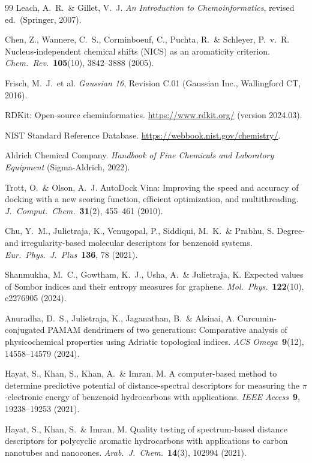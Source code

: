 \documentclass[12pt,a4paper]{article}
\begin{document}
\begin{thebibliography}{99}
Leach, A.~R.\ \& Gillet, V.~J.
\textit{An Introduction to Chemoinformatics}, revised ed.\ (Springer, 2007).

Chen, Z., Wannere, C.~S., Corminboeuf, C., Puchta, R.\ \& Schleyer, P.~v.~R.
Nucleus-independent chemical shifts (NICS) as an aromaticity criterion.
\textit{Chem.\ Rev.}\ \textbf{105}(10), 3842--3888 (2005).

Frisch, M.~J.\ et al.
\textit{Gaussian 16}, Revision C.01 (Gaussian Inc., Wallingford CT, 2016).

RDKit: Open-source cheminformatics. \url{https://www.rdkit.org/} (version 2024.03).

NIST Standard Reference Database.
\url{https://webbook.nist.gov/chemistry/}.

Aldrich Chemical Company.
\textit{Handbook of Fine Chemicals and Laboratory Equipment} (Sigma-Aldrich, 2022).

Trott, O.\ \& Olson, A.~J.
AutoDock Vina: Improving the speed and accuracy of docking with a new scoring function, efficient optimization, and multithreading.
\textit{J.\ Comput.\ Chem.}\ \textbf{31}(2), 455--461 (2010).

Chu, Y.~M., Julietraja, K., Venugopal, P., Siddiqui, M.~K.\ \& Prabhu, S.
Degree- and irregularity-based molecular descriptors for benzenoid systems.
\textit{Eur.\ Phys.\ J.\ Plus}\ \textbf{136}, 78 (2021).

Shanmukha, M.~C., Gowtham, K.~J., Usha, A.\ \& Julietraja, K.
Expected values of Sombor indices and their entropy measures for graphene.
\textit{Mol.\ Phys.}\ \textbf{122}(10), e2276905 (2024).

Anuradha, D.~S., Julietraja, K., Jaganathan, B.\ \& Alsinai, A.
Curcumin-conjugated PAMAM dendrimers of two generations: Comparative analysis of physicochemical properties using Adriatic topological indices.
\textit{ACS Omega}\ \textbf{9}(12), 14558--14579 (2024).

Hayat, S., Khan, S., Khan, A.\ \& Imran, M.
A computer-based method to determine predictive potential of distance-spectral descriptors for measuring the $\pi$-electronic energy of benzenoid hydrocarbons with applications.
\textit{IEEE Access}\ \textbf{9}, 19238--19253 (2021).

Hayat, S., Khan, S.\ \& Imran, M.
Quality testing of spectrum-based distance descriptors for polycyclic aromatic hydrocarbons with applications to carbon nanotubes and nanocones.
\textit{Arab.\ J.\ Chem.}\ \textbf{14}(3), 102994 (2021).


\end{thebibliography}
\end{document}
